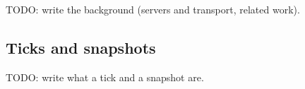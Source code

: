 %
%
TODO: write the background (servers and transport, related work).

\subsection{Ticks and snapshots}
TODO: write what a tick and a snapshot are.

